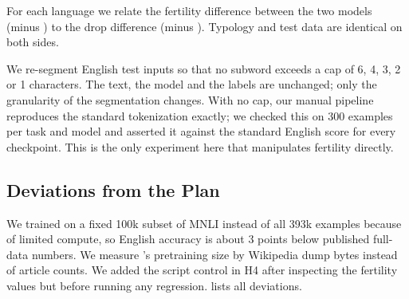 For each language we relate the fertility difference between the two models (\mbert minus \xlmr) to the drop difference (\mbert minus \xlmr).
Typology and test data are identical on both sides.

We re-segment English test inputs so that no subword exceeds a cap of 6, 4, 3, 2 or 1 characters.
The text, the model and the labels are unchanged; only the granularity of the segmentation changes.
With no cap, our manual pipeline reproduces the standard tokenization exactly; we checked this on 300 examples per task and model and asserted it against the standard English score for every checkpoint.
This is the only experiment here that manipulates fertility directly.

\subsection{Deviations from the Plan}
We trained \xnli on a fixed 100k subset of MNLI instead of all 393k examples because of limited compute, so English accuracy is about 3 points below published full-data numbers.
We measure \mbert's pretraining size by Wikipedia dump bytes instead of article counts.
We added the script control in H4 after inspecting the fertility values but before running any regression.
 lists all deviations.
